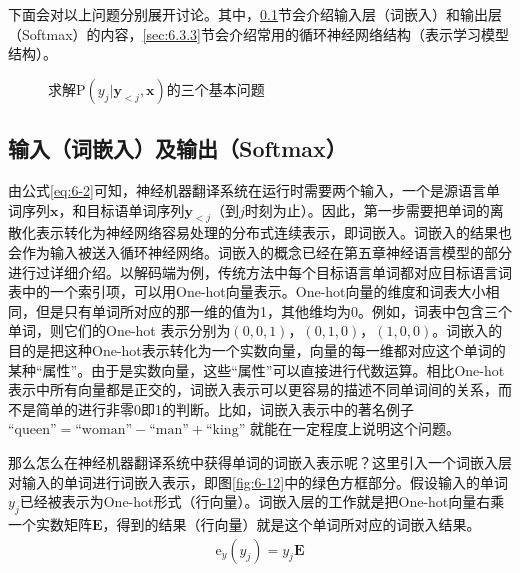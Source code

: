 \parinterval 下面会对以上问题分别展开讨论。其中，\ref{sec:6.3.2}节会介绍输入层（词嵌入）和输出层（Softmax）的内容，\ref{sec:6.3.3}节会介绍常用的循环神经网络结构（表示学习模型结构）。

\begin{figure}[htp]
\centering
 
\caption{求解$\textrm{P} (y_j | \mathbf{y}_{<j},\mathbf{x})$的三个基本问题}
\label{fig:6-11}
\end{figure}


\subsection{输入（词嵌入）及输出（Softmax）}
\label{sec:6.3.2}

\parinterval 由公式\ref{eq:6-2}可知，神经机器翻译系统在运行时需要两个输入，一个是源语言单词序列$\mathbf{x}$，和目标语单词序列$\mathbf{y}_{<j}$（到$j$时刻为止）。因此，第一步需要把单词的离散化表示转化为神经网络容易处理的分布式连续表示，即词嵌入。词嵌入的结果也会作为输入被送入循环神经网络。词嵌入的概念已经在第五章神经语言模型的部分进行过详细介绍。以解码端为例，传统方法中每个目标语言单词都对应目标语言词表中的一个索引项，可以用One-hot向量表示。One-hot向量的维度和词表大小相同，但是只有单词所对应的那一维的值为1，其他维均为0。例如，词表中包含三个单词，则它们的One-hot 表示分别为$(0,0,1)$，$(0,1,0)$，$(1,0,0)$。词嵌入的目的是把这种One-hot表示转化为一个实数向量，向量的每一维都对应这个单词的某种``属性''。由于是实数向量，这些``属性''可以直接进行代数运算。相比One-hot表示中所有向量都是正交的，词嵌入表示可以更容易的描述不同单词间的关系，而不是简单的进行非零0即1的判断。比如，词嵌入表示中的著名例子$\textrm{``queen''}=\textrm{``woman''}-\textrm{``man''}+\textrm{``king''}$ 就能在一定程度上说明这个问题。

\parinterval 那么怎么在神经机器翻译系统中获得单词的词嵌入表示呢？这里引入一个词嵌入层对输入的单词进行词嵌入表示，即图\ref{fig:6-12}中的绿色方框部分。假设输入的单词$y_j$已经被表示为One-hot形式（行向量）。词嵌入层的工作就是把One-hot向量右乘一个实数矩阵$\mathbf{E}$，得到的结果（行向量）就是这个单词所对应的词嵌入结果。
\begin{eqnarray}
\textrm{e}_y (y_j) = y_j \mathbf{E}
\label{eq:6-6}
\end{eqnarray}

